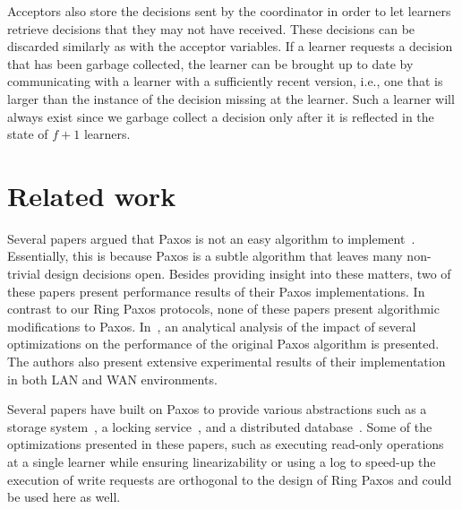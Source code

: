 \documentclass[final,3p,times,twocolumn,authoryear]{elsarticle}
\begin{document}
Acceptors also store the decisions sent by the coordinator in order to let learners retrieve decisions that they may not have received.  These decisions can be discarded similarly as with the acceptor variables.  If a learner requests a decision that has been garbage collected, the learner can be brought up to date by communicating with a learner with a sufficiently recent version, i.e., one that is larger than the instance of the decision missing at the learner.  Such a learner will always exist since we garbage collect a decision only after it is reflected in the state of $f+1$ learners.


\section{Related work}
\label{sec:rwork}


Several papers argued that Paxos is not an easy algorithm to implement~\cite{CGR07,KA08,RVR11}. Essentially, this is because Paxos is a subtle algorithm that leaves many non-trivial design decisions open. Besides providing insight into these matters, two of these papers present performance results of their Paxos implementations. In contrast to our Ring Paxos protocols, none of these papers present algorithmic modifications to Paxos. In~\cite{SS12}, an analytical analysis of the impact of several optimizations on the performance of the original Paxos algorithm is presented.  The authors also present extensive experimental results of their implementation in both LAN and WAN environments.

Several papers have built on Paxos to provide various abstractions such as a storage system~\cite{B2011}, a locking service~\cite{Bur06}, and a distributed database~\cite{megastore}.  Some of the optimizations presented in these papers, such as executing read-only operations at a single learner while ensuring linearizability or using a log to speed-up the execution of write requests are orthogonal to the design of Ring Paxos and could be used here as well.
\end{document}
